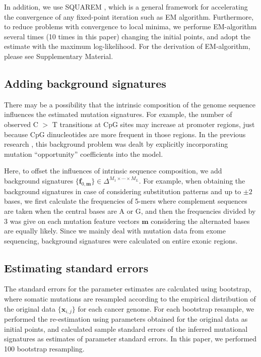 In addition, we use SQUAREM \cite{varadhan2008simple},
which is a general framework for accelerating the convergence of any fixed-point iteration such as EM algorithm. 
Furthermore, to reduce problems with convergence to local minima, 
we performe EM-algorithm several times (10 times in this paper) changing the initial points,
and adopt the estimate with the maximum log-likelihood.
For the derivation of EM-algorithm, please see Supplementary Material.


\subsection*{Adding background signatures}

There may be a possibility that the intrinsic composition of the genome sequence influences the estimated mutation signatures.
For example, the number of observed C $>$ T transitions at CpG sites may increase at promoter regions,
just because CpG dinucleotides are more frequent in those regions.
In the previous research \cite{pmid23628380}, this background problem was dealt 
by explicitly incorporating mutation ``opportunity'' coefficients into the model.

Here, to offset the influences of intrinsic sequence composition, we add background signatures 
$\{ \bm{f}_{0, \bm{m}} \} \in \Delta^{M_1 \times  \cdots \times M_L}$.
For example, when obtaining the background signatures in case of considering substitution patterns and up to $\pm 2$ bases, 
we first calculate the frequencies of 5-mers where complement sequences are taken when the central bases are A or G,
and then the frequencies divided by 3 was give on each mutation feature vectors $\bm{m}$
considering the alternated bases are equally likely.
Since we mainly deal with mutation data from exome sequencing,
background signatures were calculated on entire exonic regions.


\subsection*{Estimating standard errors}

The standard errors for the parameter estimates are calculated using bootstrap, 
where somatic mutations are resampled according to the empirical distribution of the original data $\{ \bm{x}_{i,j} \}$ for each cancer genome.
For each bootstrap resample, we performed the re-estimation using parameters obtained for the original data as initial points,
and calculated sample standard errors of the inferred mutational signatures as estimates of parameter standard errors.
In this paper, we performed 100 bootstrap resampling.


